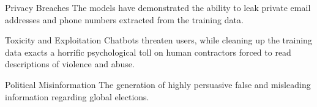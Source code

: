 \documentclass[aspectratio=169]{beamer}
\begin{document}
\begin{frame}{Privacy Breaches}
    The models have demonstrated the ability to leak private email addresses and phone numbers extracted from the training data.
    \vspace{0.5cm}
    
    \begin{figure}[htbp]
      \centering
    \end{figure}
\end{frame}

\begin{frame}{Toxicity and Exploitation}
    Chatbots threaten users, while cleaning up the training data exacts a horrific psychological toll on human contractors forced to read descriptions of violence and abuse.
    \vspace{0.5cm}
    
    \begin{figure}[htbp]
      \centering
    \end{figure}
\end{frame}

\begin{frame}{Political Misinformation}
    The generation of highly persuasive false and misleading information regarding global elections.
    \vspace{0.5cm}
    
    \begin{figure}[htbp]
      \centering
    \end{figure}
\end{frame}
\end{document}
